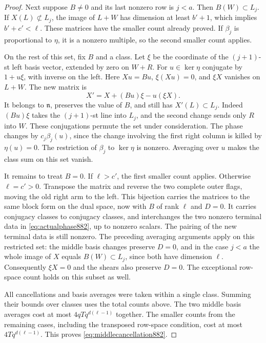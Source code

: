 \documentclass[a4paper,11pt]{article}
\theoremstyle{definition}
\theoremstyle{remark}
\numberwithin{equation}{section}
\begin{document}
\begin{proof}
Next suppose \(B\ne0\) and its last nonzero row is \(j<a\).
Then \(B(W)\subset L_j\). If \(X(L)\not\subset L_j\), the
image of \(L+W\) has dimension at least \(b'+1\), which implies
\(b'+c'<\ell\). These matrices have the smaller count already
proved. If \(\beta_j\) is proportional to \(\eta\), it is a
nonzero multiple, so the second smaller count applies.

On the rest of this set, fix \(B\) and a class. Let \(\xi\) be
the coordinate of the \((j+1)\)-st left basis vector, extended
by zero on \(W+R\). For \(u\in\ker\eta\) conjugate by
\(1+u\xi\), with inverse on the left. Here \(Xu=Bu\),
\(\xi(Xu)=0\), and \(\xi X\) vanishes on \(L+W\). The new
matrix is
\[
             X'=X+(Bu)\xi-u(\xi X).
\]
It belongs to \(\mathfrak n\), preserves the value of \(B\), and
still has \(X'(L)\subset L_j\). Indeed \((Bu)\xi\) takes the
\((j+1)\)-st line into \(L_j\), and the second change sends only
\(R\) into \(W\). These conjugations permute the set under
consideration. The phase changes by \(c_j\beta_j(u)\), since the
change involving the first right column is killed by \(\eta(u)=0\).
The restriction of \(\beta_j\) to \(\ker\eta\) is nonzero.
Averaging over \(u\) makes the class sum on this set vanish.

It remains to treat \(B=0\). If \(\ell>c'\), the first smaller
count applies. Otherwise \(\ell=c'>0\). Transpose the matrix and
reverse the two complete outer flags, moving the old right arm
to the left. This bijection carries the matrices to the same
block form on the dual space, now with \(B\) of rank \(\ell\)
and \(D=0\). It carries conjugacy classes to conjugacy classes,
and interchanges the two nonzero terminal data in
\eqref{eq:actualphase882}, up to nonzero scalars. The pairing of
the new terminal data is still nonzero. The preceding averaging
arguments apply on this restricted set: the middle basis
changes preserve \(D=0\), and in the case \(j<a\) the whole
image of \(X\) equals \(B(W)\subset L_j\), since both have
dimension \(\ell\). Consequently \(\xi X=0\) and the shears
also preserve \(D=0\). The exceptional row-space count holds on
this subset as well.

All cancellations and basis averages were taken within a single
class. Summing their bounds over classes uses the total counts
above. The two middle basis averages cost at most
\(4qTq^{d(\ell-1)}\) together. The smaller counts from the
remaining cases, including the transposed row-space condition,
cost at most \(4Tq^{d(\ell-1)}\). This proves
\eqref{eq:middlecancellation882}.
\end{proof}
\end{document}
